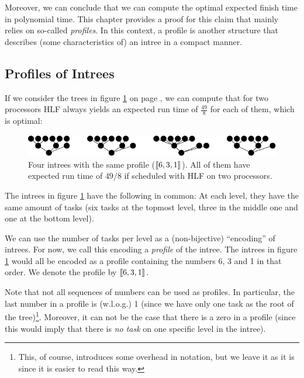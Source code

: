 
Moreover, we can conclude that we can compute the optimal expected finish time in polynomial time. This chapter provides a proof for this claim that mainly relies on so-called \emph{profiles}. In this context, a profile is another structure that describes (some characteristics of) an intree in a compact manner.

\subsection{Profiles of Intrees}
\label{sec:p2-simple-method-runtime-profiles-for-intrees}

If we consider the trees in figure \ref{fig:p2-four-intrees-with-same-profile-6-3-1} on page \pageref{sec:p2-simple-method-runtime-profiles-for-intrees}, we can compute that for two processors HLF always yields an expected run time of $\frac{49}{8}$ for each of them, which is optimal:

\begin{figure}[ht]
  \centering
  \includegraphics{p2/four_profiles_631.pdf}  
  \caption{Four intrees with the same profile ($\left\llbracket 6,3,1 \right\rrbracket$). All of them have expected run time of $49/8$ if scheduled with HLF on two processors.}
  \label{fig:p2-four-intrees-with-same-profile-6-3-1}
\end{figure}

The intrees in figure \ref{fig:p2-four-intrees-with-same-profile-6-3-1} have the following in common: At each level, they have the same amount of tasks (six tasks at the topmost level, three in the middle one and one at the bottom level).

We can use the number of tasks per level as a (non-bijective) ``encoding'' of intrees. For now, we call this encoding a \emph{profile} of the intree. The intrees in figure \ref{fig:p2-four-intrees-with-same-profile-6-3-1} would all be encoded as a profile containing the numbers 6, 3 and 1 in that order. We denote the profile by $\left\llbracket 6, 3, 1 \right\rrbracket$.

Note that not all sequences of numbers can be used as profiles. In particular, the last number in a profile is (w.l.o.g.) 1 (since we have only one task as the root of the tree)\footnote{This, of course, introduces some overhead in notation, but we leave it as it is since it is easier to read this way.}. Moreover, it can not be the case that there is a zero in a profile (since this would imply that there is \emph{no task} on one specific level in the intree).

